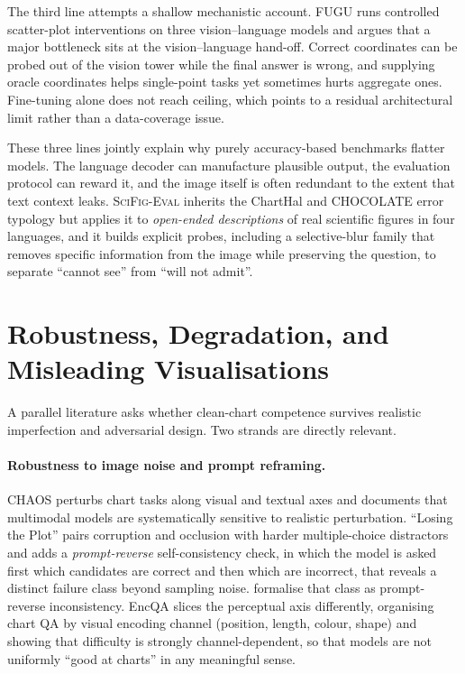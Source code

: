 The third line attempts a shallow mechanistic account. FUGU
\citep{tartaglini2025fugu} runs controlled scatter-plot interventions
on three vision--language models and argues that a major bottleneck
sits at the vision--language hand-off. Correct coordinates can be
probed out of the vision tower while the final answer is wrong, and
supplying oracle coordinates helps single-point tasks yet sometimes
hurts aggregate ones. Fine-tuning alone does not reach ceiling,
which points to a residual architectural limit rather than a
data-coverage issue.

These three lines jointly explain why purely accuracy-based
benchmarks flatter models. The language decoder can manufacture
plausible output, the evaluation protocol can reward it, and the
image itself is often redundant to the extent that text context
leaks. \textsc{SciFig-Eval} inherits the ChartHal and CHOCOLATE
error typology but applies it to \emph{open-ended descriptions} of
real scientific figures in four languages, and it builds explicit
probes, including a selective-blur family that removes specific
information from the image while preserving the question, to
separate ``cannot see'' from ``will not admit''.

\section{Robustness, Degradation, and Misleading Visualisations}
\label{sec:lit-robust}

A parallel literature asks whether clean-chart competence survives
realistic imperfection and adversarial design. Two strands are
directly relevant.

\paragraph{Robustness to image noise and prompt reframing.} CHAOS
\citep{moured2025chaos} perturbs chart tasks along visual and
textual axes and documents that multimodal models are systematically
sensitive to realistic perturbation. ``Losing the Plot''
\citep{shin2025losing} pairs corruption and occlusion with harder
multiple-choice distractors and adds a \emph{prompt-reverse}
self-consistency check, in which the model is asked first which
candidates are correct and then which are incorrect, that reveals a
distinct failure class beyond sampling noise.
\citet{ahn2025prin} formalise that class as prompt-reverse
inconsistency. EncQA \citep{apple2025encqa} slices the perceptual
axis differently, organising chart QA by visual encoding channel
(position, length, colour, shape) and showing that difficulty is
strongly channel-dependent, so that models are not uniformly
``good at charts'' in any meaningful sense.


